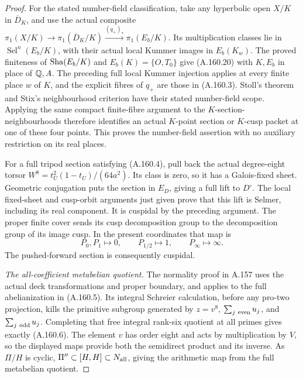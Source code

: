 \begin{proof}
For the stated number-field classification, take any
hyperbolic open \(X/K\) in \(\overline D_K\), and use
the actual composite
\(\pi_1(X/K)\to\pi_1(\overline D_K/K)
\xrightarrow{(q_+)_*}\pi_1(E_b/K)\).
Its multiplication classes lie in
\(\operatorname{Sel}^n(E_b/K)\), with their actual local
Kummer images in \(E_b(K_w)\).  The proved finiteness
of \(\operatorname{Sha}(E_b/K)\) and \(E_b(K)=\{O,T_0\}\)
give (A.160.20) with \(K,E_b\) in place of \(\mathbb Q,A\).
The preceding full local Kummer injection applies at
every finite place \(w\) of \(K\), and the explicit
fibres of \(q_+\) are those in (A.160.3).  Stoll's
theorem and Stix's neighbourhood criterion have their
stated number-field scope.  Applying the same compact
finite-fibre argument to the \(K\)-section-neighbourhoods
therefore identifies an actual \(K\)-point section or
\(K\)-cusp packet at one of these four points.  This
proves the number-field assertion with no auxiliary
restriction on its real places.

For a full tripod section satisfying (A.160.4), pull
back the actual degree-eight torsor
\(W^8=t_U^2(1-t_U)/(64a^2)\).  Its class is zero,
so it has a Galois-fixed sheet.  Geometric conjugation
puts the section in \(E_D\), giving a full lift to
\(D^\circ\).  The local fixed-sheet and cusp-orbit
arguments just given prove that this lift is Selmer,
including its real component.  It is cuspidal by the
preceding argument.  The proper finite cover sends its
cusp decomposition group to the decomposition group of
its image cusp.  In the present coordinates that map is
\[
        P_0,P_1\longmapsto0,\qquad
        P_{1/2}\longmapsto1,\qquad P_\infty\longmapsto\infty.
\tag{A.160.21}
\]
The pushed-forward section is consequently cuspidal.

\emph{The all-coefficient metabelian quotient.}
The normality proof in A.157 uses the actual deck
transformations and proper boundary, and applies to
the full abelianization in (A.160.5).  Its integral
Schreier calculation, before any pro-two projection,
kills the primitive subgroup generated by
\(z=v^8\), \(\sum_{j\ {\rm even}}u_j\), and
\(\sum_{j\ {\rm odd}}u_j\).  Completing that free
integral rank-six quotient at all primes gives exactly
(A.160.6).  The element \(v\) has order eight and
acts by multiplication by \(V\), so the displayed
maps provide both the semidirect product and its inverse.
As \(\Pi/H\) is cyclic,
\(\Pi''\subset[H,H]\subset N_{\rm all}\), giving
the arithmetic map from the full metabelian quotient.


\end{proof}
